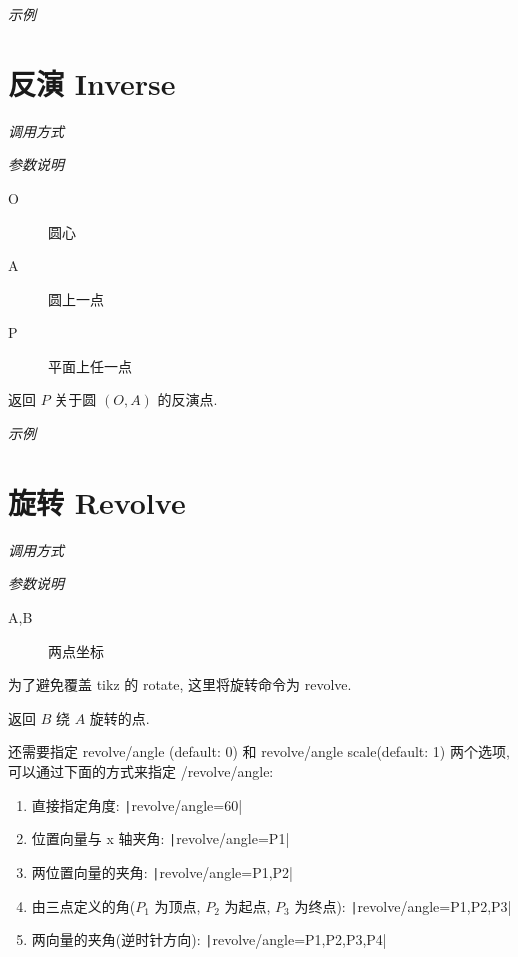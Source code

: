 \emph{示例}


\section{反演 Inverse}

\emph{调用方式}

\begin{tcolorbox}{}
\end{tcolorbox}

\emph{参数说明}

\begin{description}
  \item[O] 圆心
  \item[A] 圆上一点
  \item[P] 平面上任一点 
\end{description}

返回 $P$ 关于圆 $(O,A)$ 的反演点.

\emph{示例}


\section{旋转 Revolve}

\emph{调用方式}

\begin{tcolorbox}{}
\end{tcolorbox}

\emph{参数说明}

\begin{description}
  \item[A,B] 两点坐标
\end{description}

\begin{remark*}
  为了避免覆盖 tikz 的 rotate, 这里将旋转命令为 revolve.
\end{remark*}

返回 $B$ 绕 $A$ 旋转的点.

还需要指定 revolve/angle (default: 0) 和 revolve/angle scale(default: 1) 两个选项,可以通过下面的方式来指定 /revolve/angle:

\begin{enumerate}
  \item 直接指定角度: \texttt|revolve/angle=60|
  \item 位置向量与 x 轴夹角: \texttt|revolve/angle={P1}|
  \item 两位置向量的夹角: \texttt|revolve/angle={P1,P2}|
  \item 由三点定义的角($P_1$ 为顶点, $P_2$ 为起点, $P_3$ 为终点): \texttt|revolve/angle={P1,P2,P3}|
  \item 两向量的夹角(逆时针方向): \texttt|revolve/angle={P1,P2,P3,P4}|
\end{enumerate}

